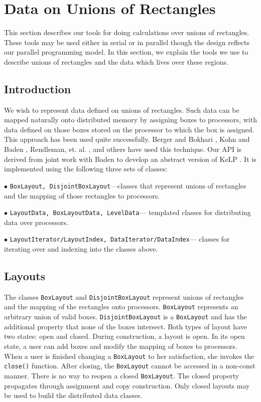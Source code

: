 \section{Data on Unions of Rectangles}
\label{MultiBoxSection}
This section describes our tools for doing calculations over
unions of rectangles.  These tools may be used either
in serial or in parallel though the design reflects
our parallel programming model.  
In this section, we explain the tools 
we use to describe unions of rectangles and the data which lives
over these regions.

\subsection{Introduction}

We wish to represent data defined on unions of rectangles.
Such data can be mapped naturally onto distributed memory
by assigning boxes to processors, with data defined on
those boxes stored on the processor to which the box is
assigned.  This approach has been used quite successfully.
Berger and Bokhari \cite{BergerBokhari1986},
Kohn and Baden 
\cite{KohnBaden1996}, 
Rendleman, et. al. \cite{CCSE1999}, 
and others have used this technique.
Our API is derived from joint work with Baden to develop an abstract
version of KeLP \cite{fink96:kelp}.
It is implemented using the following three sets
of classes:
\begin{trivlist}
\item $\bullet$ 
{\tt BoxLayout, DisjointBoxLayout}---classes that 
        represent unions of rectangles and the mapping of those 
        rectangles to processors.
\item $\bullet$ 
{\tt LayoutData, BoxLayoutData, LevelData}---
        templated classes for distributing data over
        processors.
\item $\bullet$ 
{\tt LayoutIterator/LayoutIndex, DataIterator/DataIndex}---
        classes for iterating over and indexing into the classes
        above.
\end{trivlist}

\subsection{Layouts}
\label{LayoutSection}
The classes {\tt BoxLayout} and {\tt DisjointBoxLayout} represent
unions of rectangles and the mapping of the rectangles
onto processors.  {\tt BoxLayout}  represents an arbitrary
union of valid boxes. {\tt DisjointBoxLayout} is a
{\tt BoxLayout} and has the additional 
property that none of the boxes intersect.  
Both types of layout have two states:  open and
closed.  During construction, a layout is open.  In its
open state, a user can add boxes and modify the mapping 
of boxes to processors.  When a user is finished changing
a {\tt BoxLayout} to her satisfaction, she invokes 
the {\tt close()} function.
After closing, the {\tt BoxLayout} cannot be accessed
in a non-const manner.  There is no way to 
reopen a closed {\tt BoxLayout}.
The closed property propagates through assignment and copy construction.
Only closed layouts may be used to build the distributed
data classes.

